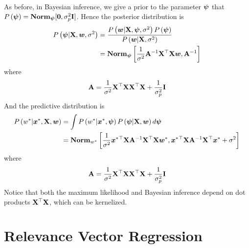 As before, in Bayesian inference, we give a prior to the parameter $\boldsymbol{\psi}$ that $P\left(\boldsymbol{\psi}\right)=\mathbf{Norm}_{\boldsymbol{\psi}}[\boldsymbol{0},\sigma_p^2\mathbf{I}]$. Hence the posterior distribution is
\begin{align*}
	P\left(\boldsymbol{\psi}|\mathbf{X},\boldsymbol{w},\sigma^2\right)&=\frac{P\left(\boldsymbol{w}|\mathbf{X},\boldsymbol{\psi},\sigma^2\right)P\left(\boldsymbol{\psi}\right)}{P\left(\boldsymbol{w}|\mathbf{X},\sigma^2\right)} \\
	&=\mathbf{Norm}_{\boldsymbol{\psi}}\left[\frac{1}{\sigma^2}\mathbf{A}^{-1}\mathbf{X}^\top\mathbf{X}\boldsymbol{w},\mathbf{A}^{-1}\right]
\end{align*}
where
\begin{align*}
	\mathbf{A}=\frac{1}{\sigma^2}\mathbf{X}^\top\mathbf{X}\mathbf{X}^\top\mathbf{X}+\frac{1}{\sigma_p^2}\mathbf{I}
\end{align*}
And the predictive distribution is
\begin{align*}
	P\left(w^*|\boldsymbol{x}^*,\mathbf{X},\boldsymbol{w}\right)&=\int P\left(w^*|\boldsymbol{x}^*,\boldsymbol{\psi}\right)P\left(\boldsymbol{\psi}|\mathbf{X},\boldsymbol{w}\right)d\boldsymbol{\psi} \\
	&=\mathbf{Norm}_{w^*}\left[\frac{1}{\sigma^2}\boldsymbol{x}^*{}^\top\mathbf{X}\mathbf{A}^{-1}\mathbf{X}^\top\mathbf{X}\boldsymbol{w}^*,\boldsymbol{x}^*{}^\top\mathbf{X}\mathbf{A}^{-1}\mathbf{X}^\top\boldsymbol{x}^*+\sigma^2\right]
\end{align*}
where
\begin{align*}
\mathbf{A}=\frac{1}{\sigma^2}\mathbf{X}^\top\mathbf{X}\mathbf{X}^\top\mathbf{X}+\frac{1}{\sigma_p^2}\mathbf{I}
\end{align*}
Notice that both the maximum likelihood and Bayesian inference depend on dot products $\mathbf{X}^\top\mathbf{X}$, which can be kernelized.

\section{Relevance Vector Regression}


